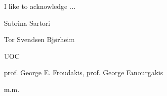 
I like to acknowledge ... 

Sabrina Sartori 

Tor Svendsen Bjørheim 


UOC

prof. George E. Froudakis,
prof. George Fanourgakis

m.m.


